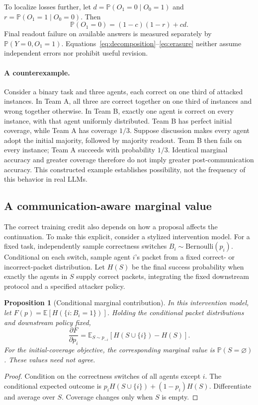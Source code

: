 \documentclass[10pt,twocolumn]{article}
\newcommand{\E}{\mathbb{E}}
\newcommand{\Prob}{\mathbb{P}}
\newtheorem{proposition}{Proposition}
\begin{document}
To localize losses further, let $d=\Prob(O_1=0\mid O_0=1)$ and $r=\Prob(O_1=1\mid O_0=0)$. Then
\begin{equation}
 \Prob(O_1=0)=(1-c)(1-r)+cd.
 \label{eq:erasure}
\end{equation}
Final readout failure on available answers is measured separately by $\Prob(Y=0,O_1=1)$. Equations~\eqref{eq:decomposition}--\eqref{eq:erasure} neither assume independent errors nor prohibit useful revision.

\paragraph{A counterexample.}
Consider a binary task and three agents, each correct on one third of attacked instances. In Team A, all three are correct together on one third of instances and wrong together otherwise. In Team B, exactly one agent is correct on every instance, with that agent uniformly distributed. Team B has perfect initial coverage, while Team A has coverage $1/3$. Suppose discussion makes every agent adopt the initial majority, followed by majority readout. Team B then fails on every instance; Team A succeeds with probability $1/3$. Identical marginal accuracy and greater coverage therefore do not imply greater post-communication accuracy. This constructed example establishes possibility, not the frequency of this behavior in real LLMs.

\subsection{A communication-aware marginal value}
The correct training credit also depends on how a proposal affects the continuation. To make this explicit, consider a stylized intervention model. For a fixed task, independently sample correctness switches $B_i\sim\mathrm{Bernoulli}(p_i)$. Conditional on each switch, sample agent $i$'s packet from a fixed correct- or incorrect-packet distribution. Let $H(S)$ be the final success probability when exactly the agents in $S$ supply correct packets, integrating the fixed downstream protocol and a specified attacker policy.

\begin{proposition}[Conditional marginal contribution]
\label{prop:marginal}
In this intervention model, let $F(p)=\E[H(\{i:B_i=1\})]$. Holding the conditional packet distributions and downstream policy fixed,
\begin{equation}
 \frac{\partial F}{\partial p_i}
 =\E_{S\sim p_{-i}}\left[H(S\cup\{i\})-H(S)\right].
 \label{eq:marginal}
\end{equation}
For the initial-coverage objective, the corresponding marginal value is $\Prob(S=\varnothing)$. These values need not agree.
\end{proposition}
\begin{proof}
Condition on the correctness switches of all agents except $i$. The conditional expected outcome is $p_iH(S\cup\{i\})+(1-p_i)H(S)$. Differentiate and average over $S$. Coverage changes only when $S$ is empty.
\end{proof}
\end{document}
